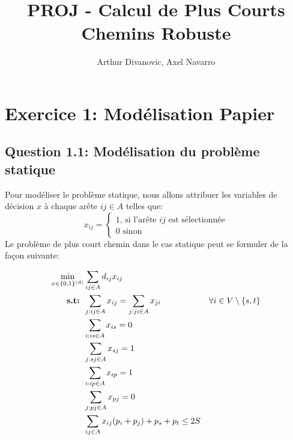 \documentclass{article}
\title{PROJ - Calcul de Plus Courts Chemins Robuste}
\author{Arthur Divanovic, Axel Navarro}
\begin{document}
\maketitle



\newpage
\tableofcontents

\newpage 
\section{Exercice 1: Modélisation Papier}

\subsection{Question 1.1: Modélisation du problème statique}

Pour modéliser le problème statique, nous allons attribuer les variables de décision $x$ à chaque arête $ij \in A$ telles que:
$$  x_{ij} = 
\begin{cases}
  1 \text{, si l'arête $ij$ est sélectionnée} \\
    0 \text{ sinon}
\end{cases}$$
Le problème de plus court chemin dans le cas statique peut se formuler de la façon suivante:

\begin{align}
    \min_{x \in \{0,1\}^{|A|}} & \sum_{ij \in A} d_{ij} x_{ij} && \notag \\
    \textbf{s.t: }  &\sum_{j: ij \in A} x_{ij} = \sum_{j: ji \in A} x_{ji} && \forall i \in V \setminus{\{s,t\}} \label{eq:constraint1} \\
    &\sum_{i: is \in A} x_{is} = 0 \label{eq:constraint3} \\
    &\sum_{j: sj \in A} x_{sj} = 1 \label{eq:constraint4} \\
    &\sum_{i: ip \in A} x_{ip} = 1 \label{eq:constraint5} \\
    &\sum_{j: pj \in A} x_{pj} = 0 \label{eq:constraint6} \\
    &\sum_{ij \in A} x_{ij}(p_i + p_j) + p_s + p_t \leq 2S \label{eq:constraint7}
\end{align}
\end{document}

